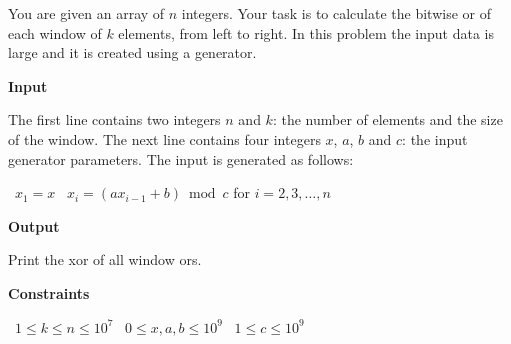 You are given an array of $n$ integers. Your task is to calculate the bitwise or of each window of $k$ elements, from left to right.
In this problem the input data is large and it is created using a generator.

\vspace{0.3cm}\noindent\textbf{Input}

The first line contains two integers $n$ and $k$: the number of elements and the size of the window.
The next line contains four integers $x$, $a$, $b$ and $c$: the input generator parameters. The input is generated as follows:

\textbullet\ $x_1=x$
\textbullet\ $x_i=(ax_{i-1}+b) \bmod c$ for $i=2,3,\dots,n$

\vspace{0.3cm}\noindent\textbf{Output}

Print the xor of all window ors.

\vspace{0.3cm}\noindent\textbf{Constraints}

\textbullet\ $1 \le k \le n \le 10^7$
\textbullet\ $0 \le x, a, b \le 10^9$
\textbullet\ $1 \le c \le 10^9$